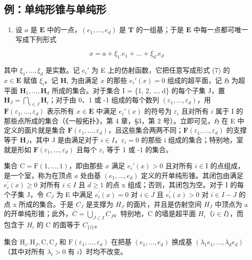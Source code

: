 \subsection{例：单纯形锥与单纯形}

\begin{enumerate}
\def\labelenumi{\alph{enumi})}
\tightlist
\item
  设 \(a\) 是 \(\mathbf{E}\) 中的一点，\((e_1, \ldots, e_d)\) 是 \(\mathbf{T}\) 的一组基；于是 \(\mathbf{E}\) 中每一点都可唯一写成下列形式
\end{enumerate}

\[
x = a + \xi_ {1}. e _ {1} + \dots + \xi_ {d}. e _ {d}\tag{7}
\]

其中 \(\xi_1, \ldots, \xi_d\) 是实数。记 \(e_i'\) 为 E 上的仿射函数，它把任意写成形式 (7) 的 \(x \in \mathbf{E}\) 赋值 \(\xi_i\)。记 \(\mathbf{H}_i\) 为由满足 \(x\) 的那些 \(e_i'(x) = 0\) 组成的超平面，记 \(\mathfrak{H}\) 为超平面 \(\mathbf{H}_1, \ldots, \mathbf{H}_d\) 所成的集合。对于集合 I = \{1, 2, \ldots, d\} 的每个子集 J，置 \(\mathbf{H}_J = \bigcap_{i \in J} \mathbf{H}_i\)；对于由 0、1 或 -1 组成的每个数列 \((\varepsilon_1, \ldots, \varepsilon_d)\)，用 \(\mathbf{F}(\varepsilon_1, \ldots, \varepsilon_d)\) 表示所有 \(x \in \mathbf{E}\) 中满足 \(e_i'(x)\) 的符号为 \(\varepsilon_i\) 且对所有 \(i\) 属于 I 的那些点所成的集合（《一般拓扑》，第 4 章，§3，第 2 号）。立即可见，\(\mathfrak{H}\) 在 E 中定义的面片就是集合 \(\mathbf{F}(\varepsilon_1, \ldots, \varepsilon_d)\)，且这些集合两两不同；\(\mathbf{F}(\varepsilon_1, \ldots, \varepsilon_d)\) 的支撑等于 \(\mathbf{H}_J\)，其中 J 是由满足对于 \(i \in I\)，\(\varepsilon_i = 0\) 的那些 i 组成的集合；特别地，室就是形如 \(\mathbf{F}(\varepsilon_1, \ldots, \varepsilon_d)\) 且每个 \(\varepsilon_i\) 等于 1 或 -1 的集合。

集合 \(\mathrm{C} = \mathrm{F}(1, \ldots, 1)\)，即由那些 \(x\) 满足 \(e_i'(x) > 0\) 且对所有 \(i \in \mathrm{I}\) 的点组成，是一个室，称为在顶点 \(a\) 处由基 \((e_{1},\ldots,e_{d})\) 定义的开单纯形锥。其闭包由满足 \(e_{i}^{\prime}(x)\geqslant0\) 对所有 \(i\in I\) 且 \(d\geqslant1\) 的点 x 组成；否则，其闭包为空。对于 I 的每个子集 J，令 \(C_{J}\) 为 E 中满足 \(e_{i}^{\prime}(x)=0\) 对 \(i\in J\) 且 \(e_{i}^{\prime}(x)>0\) 对 \(i\in I-J\) 的点 x 所成的集合。于是 \(C_{J}\) 是支撑为 \(H_{J}\) 的面片，并且是仿射空间 \(H_{J}\) 中顶点为 a 的开单纯形锥；此外，\(\overline{C}=\bigcup_{J\subset I}C_{J}\)。特别地，C 的墙是超平面 \(H_{i}\)（\(i\in I\)），而包含于 \(H_{i}\) 的 C 的面等于 \(C_{\{i\}}\)。

集合 \(\mathrm{H}_i, \mathrm{H}_J, \mathrm{C}, \mathrm{C}_J\) 和 \(\mathrm{F}(\varepsilon_1, \ldots, \varepsilon_d)\) 在把基 \((e_1, \ldots, e_d)\) 换成基 \((\lambda_1 e_1, \ldots, \lambda_d e_d)\)（其中对所有 \(\lambda_i > 0\) 有 \(i\)）时均不改变。

